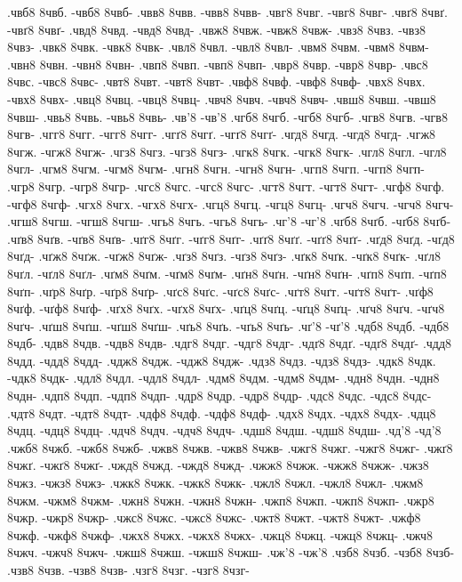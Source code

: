 {.чвб8 8чвб. -чвб8 8чвб-
.чвв8 8чвв. -чвв8 8чвв-
.чвг8 8чвг. -чвг8 8чвг-
.чвґ8 8чвґ. -чвґ8 8чвґ-
.чвд8 8чвд. -чвд8 8чвд-
.чвж8 8чвж. -чвж8 8чвж-
.чвз8 8чвз. -чвз8 8чвз-
.чвк8 8чвк. -чвк8 8чвк-
.чвл8 8чвл. -чвл8 8чвл-
.чвм8 8чвм. -чвм8 8чвм-
.чвн8 8чвн. -чвн8 8чвн-
.чвп8 8чвп. -чвп8 8чвп-
.чвр8 8чвр. -чвр8 8чвр-
.чвс8 8чвс. -чвс8 8чвс-
.чвт8 8чвт. -чвт8 8чвт-
.чвф8 8чвф. -чвф8 8чвф-
.чвх8 8чвх. -чвх8 8чвх-
.чвц8 8чвц. -чвц8 8чвц-
.чвч8 8чвч. -чвч8 8чвч-
.чвш8 8чвш. -чвш8 8чвш-
.чвь8 8чвь. -чвь8 8чвь-
.чв'8 -чв'8
.чгб8 8чгб. -чгб8 8чгб-
.чгв8 8чгв. -чгв8 8чгв-
.чгг8 8чгг. -чгг8 8чгг-
.чгґ8 8чгґ. -чгґ8 8чгґ-
.чгд8 8чгд. -чгд8 8чгд-
.чгж8 8чгж. -чгж8 8чгж-
.чгз8 8чгз. -чгз8 8чгз-
.чгк8 8чгк. -чгк8 8чгк-
.чгл8 8чгл. -чгл8 8чгл-
.чгм8 8чгм. -чгм8 8чгм-
.чгн8 8чгн. -чгн8 8чгн-
.чгп8 8чгп. -чгп8 8чгп-
.чгр8 8чгр. -чгр8 8чгр-
.чгс8 8чгс. -чгс8 8чгс-
.чгт8 8чгт. -чгт8 8чгт-
.чгф8 8чгф. -чгф8 8чгф-
.чгх8 8чгх. -чгх8 8чгх-
.чгц8 8чгц. -чгц8 8чгц-
.чгч8 8чгч. -чгч8 8чгч-
.чгш8 8чгш. -чгш8 8чгш-
.чгь8 8чгь. -чгь8 8чгь-
.чг'8 -чг'8
.чґб8 8чґб. -чґб8 8чґб-
.чґв8 8чґв. -чґв8 8чґв-
.чґг8 8чґг. -чґг8 8чґг-
.чґґ8 8чґґ. -чґґ8 8чґґ-
.чґд8 8чґд. -чґд8 8чґд-
.чґж8 8чґж. -чґж8 8чґж-
.чґз8 8чґз. -чґз8 8чґз-
.чґк8 8чґк. -чґк8 8чґк-
.чґл8 8чґл. -чґл8 8чґл-
.чґм8 8чґм. -чґм8 8чґм-
.чґн8 8чґн. -чґн8 8чґн-
.чґп8 8чґп. -чґп8 8чґп-
.чґр8 8чґр. -чґр8 8чґр-
.чґс8 8чґс. -чґс8 8чґс-
.чґт8 8чґт. -чґт8 8чґт-
.чґф8 8чґф. -чґф8 8чґф-
.чґх8 8чґх. -чґх8 8чґх-
.чґц8 8чґц. -чґц8 8чґц-
.чґч8 8чґч. -чґч8 8чґч-
.чґш8 8чґш. -чґш8 8чґш-
.чґь8 8чґь. -чґь8 8чґь-
.чґ'8 -чґ'8
.чдб8 8чдб. -чдб8 8чдб-
.чдв8 8чдв. -чдв8 8чдв-
.чдг8 8чдг. -чдг8 8чдг-
.чдґ8 8чдґ. -чдґ8 8чдґ-
.чдд8 8чдд. -чдд8 8чдд-
.чдж8 8чдж. -чдж8 8чдж-
.чдз8 8чдз. -чдз8 8чдз-
.чдк8 8чдк. -чдк8 8чдк-
.чдл8 8чдл. -чдл8 8чдл-
.чдм8 8чдм. -чдм8 8чдм-
.чдн8 8чдн. -чдн8 8чдн-
.чдп8 8чдп. -чдп8 8чдп-
.чдр8 8чдр. -чдр8 8чдр-
.чдс8 8чдс. -чдс8 8чдс-
.чдт8 8чдт. -чдт8 8чдт-
.чдф8 8чдф. -чдф8 8чдф-
.чдх8 8чдх. -чдх8 8чдх-
.чдц8 8чдц. -чдц8 8чдц-
.чдч8 8чдч. -чдч8 8чдч-
.чдш8 8чдш. -чдш8 8чдш-
.чд'8 -чд'8
.чжб8 8чжб. -чжб8 8чжб-
.чжв8 8чжв. -чжв8 8чжв-
.чжг8 8чжг. -чжг8 8чжг-
.чжґ8 8чжґ. -чжґ8 8чжґ-
.чжд8 8чжд. -чжд8 8чжд-
.чжж8 8чжж. -чжж8 8чжж-
.чжз8 8чжз. -чжз8 8чжз-
.чжк8 8чжк. -чжк8 8чжк-
.чжл8 8чжл. -чжл8 8чжл-
.чжм8 8чжм. -чжм8 8чжм-
.чжн8 8чжн. -чжн8 8чжн-
.чжп8 8чжп. -чжп8 8чжп-
.чжр8 8чжр. -чжр8 8чжр-
.чжс8 8чжс. -чжс8 8чжс-
.чжт8 8чжт. -чжт8 8чжт-
.чжф8 8чжф. -чжф8 8чжф-
.чжх8 8чжх. -чжх8 8чжх-
.чжц8 8чжц. -чжц8 8чжц-
.чжч8 8чжч. -чжч8 8чжч-
.чжш8 8чжш. -чжш8 8чжш-
.чж'8 -чж'8
.чзб8 8чзб. -чзб8 8чзб-
.чзв8 8чзв. -чзв8 8чзв-
.чзг8 8чзг. -чзг8 8чзг-
}
